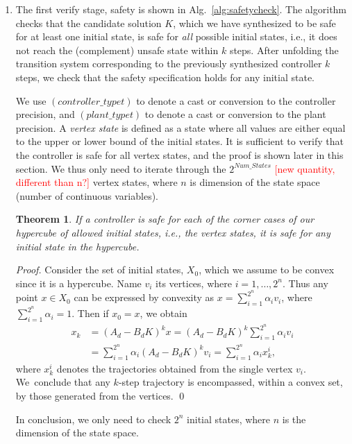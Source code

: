 \documentclass[twocolumn]{autart}    %
\newtheorem{theorem}{Theorem}
\newtheorem{proof}{Proof}
\renewcommand{\note}[1]{\textcolor{red}{[#1]}}
\begin{document}
\begin{enumerate}
\item The first {\sc verify} stage, {\sc safety} is shown in Alg.~\ref{alg:safetycheck}. 
The algorithm checks that the candidate
solution $K$, which we have synthesized to be safe for at least one initial
state, is safe for \emph{all} possible initial states, i.e., it does not reach
the (complement) unsafe state within $k$ steps.  After unfolding the transition system corresponding
to the previously synthesized controller $k$ steps, we check that the safety
specification holds for any initial state. 

We use $(controller\_typet)$ to denote a
cast or conversion to the controller precision, and $(plant\_typet)$ to denote a cast or conversion to the 
plant precision. A \emph{vertex state} is defined as a state where all values are either equal to the upper or lower
bound of the initial states. It is sufficient to verify that the controller is safe for all vertex
states, and the proof is shown later in this section. We thus only need to iterate through the $2^{Num\_States}$ \note{new quantity, different than n?} vertex
states, where $n$ is dimension of the state space (number of continuous variables).


\begin{theorem} 
If a controller is safe for each of the corner cases of our hypercube of
allowed initial states, i.e., the vertex states, it is safe for any initial state in the hypercube. 
\end{theorem}
\begin{proof}
Consider the set of initial states, $X_0$, which we assume to be convex since it is a hypercube. 
Name $v_i$ its vertices, where $i=1,\ldots, 2^n$.  
Thus any point $x \in X_0$ can be expressed by convexity as $x = \sum_{i=1}^{2^n} \alpha_i v_i$, 
where $\sum_{i=1}^{2^n} \alpha_i =1$. Then if $x_0=x$, we obtain 
\begin{align*}
x_k   &= (A_d - B_d K)^k x = (A_d - B_d K)^k \sum_{i=1}^{2^n} \alpha_i v_i \\
      &= \sum_{i=1}^{2^n} \alpha_i (A_d - B_d K)^k v_i = \sum_{i=1}^{2^n} \alpha_i x_k^i, 
 \end{align*}     
%
where $x_k^i$ denotes the trajectories obtained from the single vertex
$v_i$.  We~conclude that any $k$-step trajectory is encompassed, within a
convex set, by those generated from the vertices. 
\qed
\end{proof}
In conclusion, we only need to check $2^n$ initial states, 
where $n$ is the dimension of the state space. 



\end{enumerate}
\end{document}
